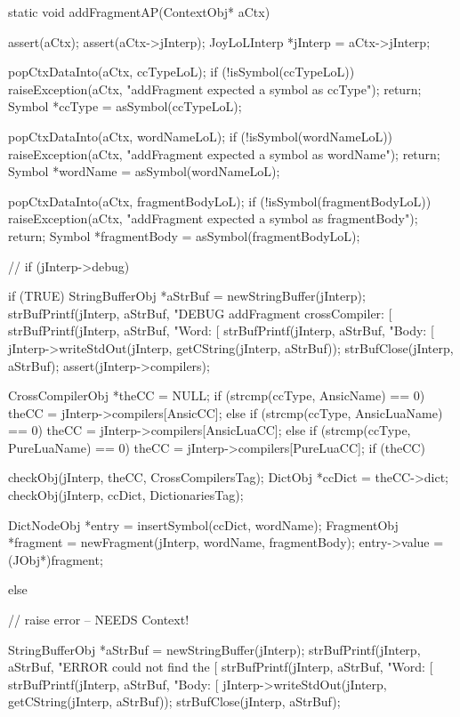 {\startTestSuite[addFragment]

\startCCode
static void addFragmentAP(ContextObj* aCtx) {
  assert(aCtx);
  assert(aCtx->jInterp);
  JoyLoLInterp *jInterp = aCtx->jInterp;

  popCtxDataInto(aCtx, ccTypeLoL);
  if (!isSymbol(ccTypeLoL)) {
    raiseException(aCtx,
      "addFragment expected a symbol as ccType");
    return;
  }
  Symbol *ccType = asSymbol(ccTypeLoL);
  
  popCtxDataInto(aCtx, wordNameLoL);
  if (!isSymbol(wordNameLoL)) {
    raiseException(aCtx,
      "addFragment expected a symbol as wordName");
    return;
  }
  Symbol *wordName = asSymbol(wordNameLoL);
  
  popCtxDataInto(aCtx, fragmentBodyLoL);
  if (!isSymbol(fragmentBodyLoL)) {
    raiseException(aCtx,
      "addFragment expected a symbol as fragmentBody");
    return;
  }
  Symbol *fragmentBody = asSymbol(fragmentBodyLoL);
  
//  if (jInterp->debug) {
  if (TRUE) {
    StringBufferObj *aStrBuf = newStringBuffer(jInterp);
    strBufPrintf(jInterp, aStrBuf, 
      "DEBUG addFragment crossCompiler: [%
    strBufPrintf(jInterp, aStrBuf, "Word: [%
    strBufPrintf(jInterp, aStrBuf, "Body: [%
    jInterp->writeStdOut(jInterp, getCString(jInterp, aStrBuf));
    strBufClose(jInterp, aStrBuf);
  }
  assert(jInterp->compilers);

  CrossCompilerObj *theCC = NULL;
  if (strcmp(ccType, AnsicName) == 0) {
    theCC = jInterp->compilers[AnsicCC];
  } else if (strcmp(ccType, AnsicLuaName) == 0) {
    theCC = jInterp->compilers[AnsicLuaCC];
  } else if (strcmp(ccType, PureLuaName) == 0) {
    theCC = jInterp->compilers[PureLuaCC];
  }
  if (theCC) {
    checkObj(jInterp, theCC, CrossCompilersTag);
    DictObj *ccDict = theCC->dict;
    checkObj(jInterp, ccDict, DictionariesTag);
    
    DictNodeObj *entry    = insertSymbol(ccDict, wordName);
    FragmentObj *fragment =
      newFragment(jInterp, wordName, fragmentBody);
    entry->value = (JObj*)fragment;
  } else {
    // raise error -- NEEDS Context!
    
    StringBufferObj *aStrBuf = newStringBuffer(jInterp);
    strBufPrintf(jInterp, aStrBuf, 
      "ERROR could not find the [%
    strBufPrintf(jInterp, aStrBuf, "Word: [%
    strBufPrintf(jInterp, aStrBuf, "Body: [%
    jInterp->writeStdOut(jInterp, getCString(jInterp, aStrBuf));
    strBufClose(jInterp, aStrBuf);
  }
}
\stopCCode

}}
